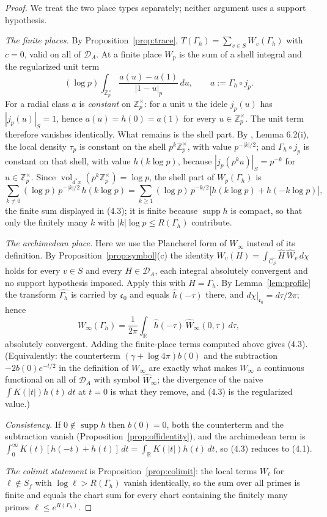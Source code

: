\documentclass[11pt]{amsart}
\theoremstyle{definition}
\theoremstyle{remark}
\newcommand{\R}{\mathbb R}
\newcommand{\Z}{\mathbb Z}
\newcommand{\supp}{\operatorname{supp}}
\newcommand{\vol}{\operatorname{vol}}
\newcommand{\DA}{\mathcal D_A}
\newcommand{\CS}{C_S}
\newcommand{\cz}{\mathfrak c_0}
\begin{document}
\begin{proof}
We treat the two place types separately; neither argument uses a support
hypothesis.

\emph{The finite places.}  By Proposition~\ref{prop:trace},
$T(\Gamma_h)=\sum_{v\in S}W_v(\Gamma_h)$ with $c=0$, valid on all of $\DA$.  At
a finite place $W_p$ is the sum of a shell integral and the regularized unit
term
\[
  (\log p)\int_{\Z_p^\times}\frac{a(u)-a(1)}{|1-u|_p}\,du ,
  \qquad a:=\Gamma_h\circ j_p .
\]
For a radial class $a$ is \emph{constant} on $\Z_p^\times$: for a unit $u$ the
idele $j_p(u)$ has $|j_p(u)|_S=1$, hence $a(u)=h(0)=a(1)$ for every
$u\in\Z_p^\times$.  The unit term therefore vanishes identically.  What
remains is the shell part.  By \cite{P43}, Lemma 6.2(i), the local
density $\tau_p$ is
constant on the shell $p^k\Z_p^\times$, with value $p^{-|k|/2}$; and
$\Gamma_h\circ j_p$ is constant on that shell, with value $h(k\log p)$, because
$|j_p(p^ku)|_S=p^{-k}$ for $u\in\Z_p^\times$.  Since
$\vol_{d^*x}(p^k\Z_p^\times)=\log p$, the shell part of $W_p(\Gamma_h)$ is
\[
  \sum_{k\ne0}(\log p)\,p^{-|k|/2}\,h(k\log p)
  =\sum_{k\ge1}(\log p)\,p^{-k/2}\bigl[h(k\log p)+h(-k\log p)\bigr],
\]
the finite sum displayed in (4.3); it is finite because $\supp h$ is compact,
so that only the finitely many $k$ with $|k|\log p\le R(\Gamma_h)$ contribute.

\emph{The archimedean place.}  Here we use the Plancherel form of $W_\infty$
instead of its definition.  By Proposition~\ref{prop:symbol}(c) the
identity $W_v(H)=\int_{\widehat{\CS}}\widehat H\,\widehat W_v\,d\chi$ holds for
every $v\in S$ and every $H\in\DA$, each integral absolutely convergent and no
support hypothesis imposed.  Apply this with $H=\Gamma_h$.  By
Lemma~\ref{lem:profile} the transform $\widehat{\Gamma_h}$ is carried by $\cz$
and equals $\hat h(-\tau)$ there, and $d\chi|_{\cz}=d\tau/2\pi$; hence
\[
  W_\infty(\Gamma_h)=\frac1{2\pi}\int_\R\hat h(-\tau)\,\widehat
  W_\infty(0,\tau)\,d\tau ,
\]
absolutely convergent.  Adding the finite-place terms computed above gives
(4.3).  (Equivalently: the counterterm $(\gamma+\log4\pi)b(0)$ and the
subtraction $-2b(0)e^{-t/2}$ in the definition of $W_\infty$ are exactly what
makes $W_\infty$ a continuous functional on all of $\DA$ with symbol
$\widehat W_\infty$; the divergence of the naive $\int K(|t|)h(t)\,dt$ at $t=0$
is what they remove, and (4.3) is the regularized value.)

\emph{Consistency.}  If $0\notin\supp h$ then $b(0)=0$, both the counterterm
and the subtraction vanish (Proposition~\ref{prop:offidentity}), and the
archimedean term is
$\int_0^\infty K(t)[h(-t)+h(t)]\,dt=\int_\R K(|t|)h(t)\,dt$, so (4.3) reduces
to (4.1).

\emph{The colimit statement} is Proposition~\ref{prop:colimit}: the local terms
$W_\ell$ for $\ell\notin S_f$ with $\log\ell>R(\Gamma_h)$ vanish identically,
so the sum over all primes is finite and equals the chart sum for every chart
containing the finitely many primes $\ell\le e^{R(\Gamma_h)}$.
\end{proof}
\end{document}
